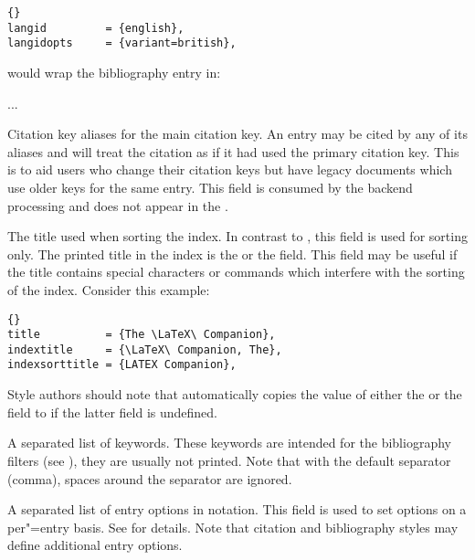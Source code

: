 \documentclass{ltxdockit}[2011/03/25]
\newcommand*{\biblatex}{\sty{biblatex}\xspace}
\begin{document}
\begin{fieldlist}
\begin{lstlisting}[style=bibtex]{}
langid         = {english},
langidopts     = {variant=british},
\end{lstlisting}
%
would wrap the bibliography entry in:

\begin{ltxexample}
\english[variant=british]
...
\endenglish
\end{ltxexample}
%


Citation key aliases for the main citation key. An entry may be cited by any of its aliases and \biblatex will treat the citation as if it had used the primary citation key. This is to aid users who change their citation keys but have legacy documents which use older keys for the same entry. This field is consumed by the backend processing and does not appear in the .


The title used when sorting the index. In contrast to , this field is used for sorting only. The printed title in the index is the  or the  field. This field may be useful if the title contains special characters or commands which interfere with the sorting of the index. Consider this example:

\begin{lstlisting}[style=bibtex]{}
title          = {The \LaTeX\ Companion},
indextitle     = {\LaTeX\ Companion, The},
indexsorttitle = {LATEX Companion},
\end{lstlisting}
%
Style authors should note that \biblatex automatically copies the value of either the  or the  field to  if the latter field is undefined.


A separated list of keywords. These keywords are intended for the bibliography filters (see ), they are usually not printed. Note that with the default separator (comma), spaces around the separator are ignored.


A separated list of entry options in \keyval notation. This field is used to set options on a per"=entry basis. See  for details. Note that citation and bibliography styles may define additional entry options.


\end{fieldlist}
\end{document}
